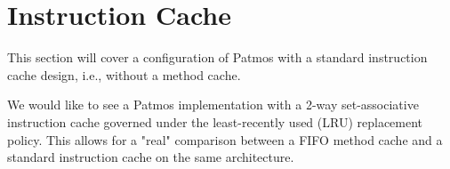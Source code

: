 \documentclass[a4paper,fontsize=10pt,twoside,DIV15,BCOR12mm,headinclude=true,footinclude=false,pagesize,bibtotoc]{scrbook}
\newcommand{\comment}[3]{

\textsf{\textbf{#1}} {\color{#3}#2}}
\newcommand{\stefan}[1]{\comment{Stefan}{#1}{RoyalPurple}}
\newcommand{\cullmann}[1]{\comment{Christoph}{#1}{Maroon}}
\newcommand{\jack}[1]{\comment{Jack}{#1}{Magenta}}
\renewcommand{\stefan}[1]{}
\renewcommand{\cullmann}[1]{}
\renewcommand{\jack}[1]{}
\begin{document}
%
%
%
%
%
%
%
%


\stefan{How do we initialize the core, i.e., how do we get the initial start-up code into the i-cache, especially when
we use software-controlled i-cache allocation? How do we handle interrupts (they need to get into the cache before they can be executed)?}

\jack{This is a good use for I-SPM. Use it as an operating system ``ROM''
or at least a first-stage bootloader.}

\section{Instruction Cache}

This section will cover a configuration of Patmos with a standard instruction cache design, i.e., without a method cache.

We would like to see a Patmos implementation with a 2-way set-associative instruction cache governed under the least-recently used (LRU) replacement policy.
This allows for a "real" comparison between a FIFO method cache and a standard instruction cache on the same architecture.

\cullmann{During the last meeting, we proposed to have a normal LRU instruction cache, not a method cache with LRU replacement.
I thought the idea was to compare the performance of a method cache with a normal cache.
Therefore we don't really see a benefit in LRU method cache but would like to see an normal instruction cache instead to allow this comparison.
}
\end{document}

